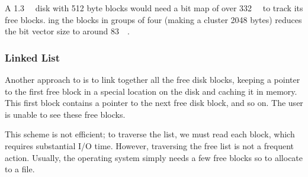 A \SI{1.3}{\gibi{} \byte{}} disk with 512 byte blocks would need a bit map of over \SI{332}{\kibi{} \byte{}} to track its free blocks.
ing the blocks in groups of four (making a cluster 2048 bytes) reduces the bit vector size to around \SI{83}{\kibi{} \byte{}}.

\subsubsection{Linked List}\label{subsubsec:Free_Space_Linked_List}
Another approach to  is to link together all the free disk blocks, keeping a pointer to the first free block in a special location on the disk and caching it in memory.
This first block contains a pointer to the next free disk block, and so on.
The user is unable to see these free blocks.

This scheme is not efficient; to traverse the list, we must read each block, which requires substantial I/O time.
However, traversing the free list is not a frequent action.
Usually, the operating system simply needs a few free blocks so to allocate to a file.


